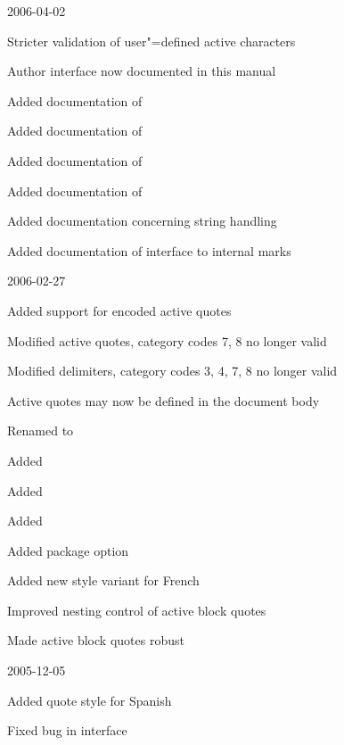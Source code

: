\documentclass{ltxdockit}[2010/09/26]
\begin{document}
\begin{changelog}
\begin{release}{3.4}{2006-04-02}
\item Stricter validation of user"=defined active characters
\item Author interface now documented in this manual
\item Added documentation of 
\item Added documentation of 
\item Added documentation of 
\item Added documentation of 
\item Added documentation concerning string handling 
\item Added documentation of interface to internal marks
\end{release}

\begin{release}{3.3}{2006-02-27}
\item Added support for \utf encoded active quotes
\item Modified active quotes, category codes 7, 8 no longer valid
\item Modified delimiters, category codes 3, 4, 7, 8 no longer valid
\item Active quotes may now be defined in the document body
\item Renamed  to 
\item Added 
\item Added 
\item Added 
\item Added package option 
\item Added new style variant for French
\item Improved nesting control of active block quotes
\item Made active block quotes robust
\end{release}

\begin{release}{3.2}{2005-12-05}
\item Added quote style for Spanish
\item Fixed bug in  interface
\end{release}


\end{changelog}
\end{document}
